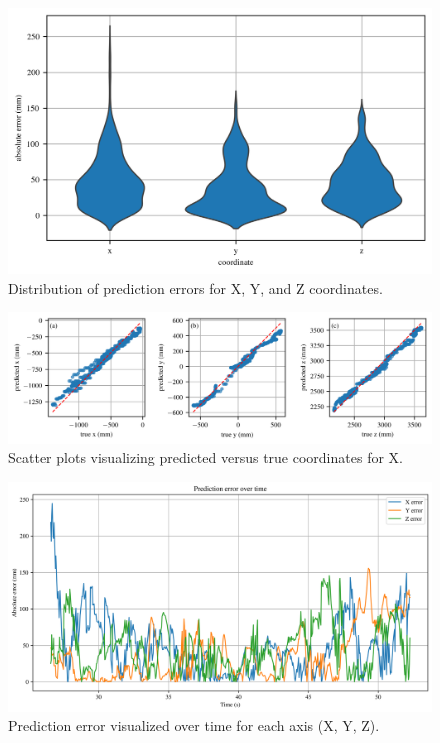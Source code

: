 \documentclass[]{spie}  %
\begin{document}
	\lipsum[1]
	
	\begin{figure}[H]
		\centering
		\includegraphics[width=6.5in]{figures/Figure4_Error_Distribution}
		\caption{Distribution of prediction errors for X, Y, and Z coordinates.}
		\label{fig:Figure4_Error_Distribution}
	\end{figure}
	
		\lipsum[1-2]
	
	\begin{figure}[H]
		\centering
		\includegraphics[width=7.0in]{figures/Figure5_Scatter}
		\caption{Scatter plots visualizing predicted versus true coordinates for X.}
		\label{fig:Figure5_Scatter}
	\end{figure}
	
	\lipsum[1-2]
	
	\begin{figure}[H]
		\centering
		\includegraphics[width=6.5in]{figures/Figure6_Error_Over_Time}
		\caption{Prediction error visualized over time for each axis (X, Y, Z).}
		\label{fig:Figure6_Error_Over_Time}
	\end{figure}
	
	\lipsum[1-2]
	
	
\end{document}
